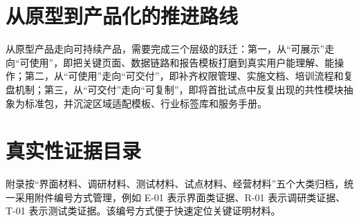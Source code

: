 \section{从原型到产品化的推进路线}

从原型产品走向可持续产品，需要完成三个层级的跃迁：第一，从“可展示”走向“可使用”，即把关键页面、数据链路和报告模板打磨到真实用户能理解、能操作；第二，从“可使用”走向“可交付”，即补齐权限管理、实施文档、培训流程和复盘机制；第三，从“可交付”走向“可复制”，即将首批试点中反复出现的共性模块抽象为标准包，并沉淀区域适配模板、行业标签库和服务手册。

\section{真实性证据目录}

附录按“界面材料、调研材料、测试材料、试点材料、经营材料”五个大类归档，统一采用附件编号方式管理，例如 E-01 表示界面类证据、R-01 表示调研类证据、T-01 表示测试类证据。该编号方式便于快速定位关键证明材料。

